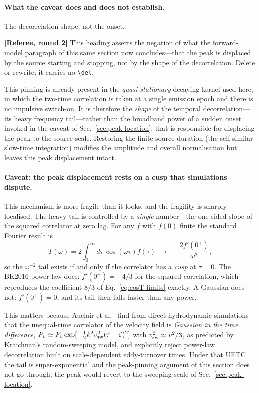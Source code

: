 \documentclass[10pt,prd,aps,nobibnotes,superscriptaddress,preprintnumbers,notitlepage]{revtex4-1}
\newcommand{\rev}[1]{\par\noindent\begin{tcolorbox}[colback=blue!4,colframe=blue!55,
    boxrule=0.5pt,left=3pt,right=3pt,top=2pt,bottom=2pt,breakable]
    \footnotesize\textcolor{blue!65!black}{\textbf{[Referee, round 2]} #1}\end{tcolorbox}\par}
\newcommand{\revX}[1]{\par\noindent\begin{tcolorbox}[colback=red!5,colframe=red!70!black,
    boxrule=1pt,left=3pt,right=3pt,top=2pt,bottom=2pt,breakable]
    \footnotesize\textcolor{red!70!black}{\textbf{[Referee, round 2 --- BLOCKING]} #1}\end{tcolorbox}\par}
\newcommand{\rev}[1]{}\newcommand{\revX}[1]{}
\newcommand{\add}[1]{{\color{red}#1}}
\newcommand{\del}[1]{{\color{red}\sout{#1}}}
\newcommand{\add}[1]{#1}
\newcommand{\del}[1]{}
\begin{document}
\paragraph{\add{What the caveat does and does not establish.}}\del{The decorrelation shape, not the onset.}
\rev{This heading asserts the negation of what the forward-model paragraph of this
same section now concludes---that the peak is displaced by the source starting and
stopping, not by the shape of the decorrelation. Delete or rewrite; it carries no
\texttt{\textbackslash del}.}
This pinning is already present in the \emph{quasi-stationary} decaying kernel used
here, in which the two-time correlation is taken at a single emission epoch and
there is no impulsive switch-on. It is therefore the \emph{shape} of the temporal
decorrelation---its heavy frequency tail---rather than the broadband power of a
sudden onset invoked in the caveat of Sec.~\ref{sec:peak-location}, that is
responsible for displacing the peak to the source scale. Restoring the finite
source duration (the self-similar slow-time integration) modifies the amplitude
and overall normalisation but leaves this peak displacement intact.

\paragraph{Caveat: the peak displacement rests on a cusp that simulations dispute.}
This mechanism is more fragile than it looks, and the fragility is sharply localised.
The heavy tail is controlled by a \emph{single} number---the one-sided slope of the
squared correlator at zero lag. For any $f$ with $f(0)$ finite the standard Fourier
result is
\begin{equation}
  T(\omega)=2\!\int_{0}^{\infty}\!d\tau\,\cos(\omega\tau)f(\tau)
  \;\longrightarrow\;-\frac{2f'(0^{+})}{\omega^{2}},
  \label{eq:cusp-tail}
\end{equation}
so the $\omega^{-2}$ tail exists if and only if the correlator has a \emph{cusp} at
$\tau=0$. The BK2016 power law does: $f'(0^{+})=-4/3$ for the squared correlation,
which reproduces the coefficient $8/3$ of Eq.~\eqref{eq:cosT-limits} exactly. A
Gaussian does not: $f'(0^{+})=0$, and its tail then falls faster than any power.

This matters because Auclair et al.~\cite{Auclair:2022jod} find from direct hydrodynamic
simulations that the unequal-time correlator of the velocity field is \emph{Gaussian in
the time difference}, $P_{v}\simeq P_{v}\exp[-\tfrac12k^{2}v_{\rm sw}^{2}(\tau-\zeta)^{2}]$
with $v_{\rm sw}^{2}\simeq\bar v^{2}/3$, as predicted by Kraichnan's random-sweeping
model, and explicitly reject power-law decorrelation built on scale-dependent
eddy-turnover times. Under that UETC the tail is super-exponential and the peak-pinning
argument of this section does not go through; the peak would revert to the sweeping
scale of Sec.~\ref{sec:peak-location}.
\end{document}
